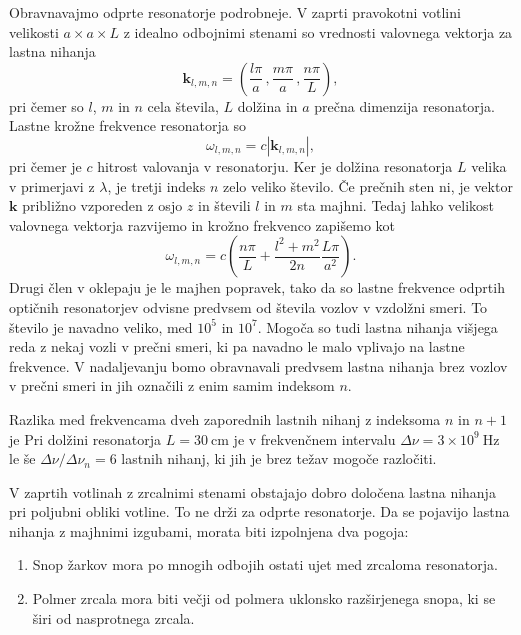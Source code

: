 Obravnavajmo odprte resonatorje podrobneje. V zaprti pravokotni votlini velikosti
$a\times a\times L$ z idealno odbojnimi stenami so vrednosti
valovnega vektorja za lastna nihanja
\begin{equation}
\mathbf{k}_{l,m,n}=\left(\frac{l\pi}{a}\,,\frac{m\pi}{a}\,,\frac{n\pi}{L}\right)\!,\label{eq:k-votlina}
\end{equation}
pri čemer so $l$, $m$ in $n$ cela števila, $L$ dolžina in $a$ prečna
dimenzija resonatorja. Lastne krožne frekvence resonatorja so 
\begin{equation}
\omega_{l,m,n}=c|\mathbf{k}_{l,m,n}|,\label{eq:omega-votlina}
\end{equation}
pri čemer je $c$ hitrost valovanja v resonatorju.
Ker je dolžina resonatorja $L$ velika v primerjavi z $\lambda$, je tretji indeks $n$
zelo veliko število. Če prečnih sten ni, je  vektor $\mathbf{k}$ približno
vzporeden z osjo $z$ in števili $l$ in $m$ sta majhni. Tedaj
lahko velikost valovnega vektorja razvijemo in krožno frekvenco zapišemo kot
\begin{equation}
\omega_{l,m,n}=c\left(\frac{n\pi}{L}+\frac{l^{2}+m^{2}}{2n}\frac{L \pi}{a^{2}}\right)\!.
\label{eq:delta-omega-resonator-razvoj}
\end{equation}
Drugi člen v oklepaju je le majhen popravek, tako da so
lastne frekvence odprtih optičnih resonatorjev odvisne predvsem od
števila vozlov v vzdolžni smeri. To število je navadno veliko, med $10^{5}$
in $10^{7}$. Mogoča so tudi lastna nihanja višjega reda z nekaj vozli v prečni
smeri, ki pa navadno le malo vplivajo na lastne frekvence. V nadaljevanju
bomo obravnavali predvsem lastna nihanja brez vozlov v prečni smeri in
jih označili z enim samim indeksom $n$.

Razlika med frekvencama dveh zaporednih lastnih nihanj 
z indeksoma $n$ in $n+1$ je
Pri dolžini resonatorja $L=30~\si{\centi\metre}$ je v frekvenčnem
intervalu $\Delta \nu = 3\times 10^{9}~\si{\hertz}$ le še $\Delta \nu /\Delta \nu_n = 6$ lastnih 
nihanj, ki jih je brez težav mogoče razločiti.

V zaprtih votlinah z zrcalnimi stenami obstajajo dobro določena lastna
nihanja pri poljubni obliki votline. To ne drži za odprte resonatorje.
Da se pojavijo lastna nihanja z majhnimi izgubami, morata
biti izpolnjena dva pogoja:

\begin{enumerate} 
\item Snop žarkov mora po mnogih odbojih ostati ujet med zrcaloma resonatorja.
\item Polmer zrcala mora biti večji od polmera uklonsko razširjenega snopa, ki se širi od nasprotnega zrcala. 
\end{enumerate}

